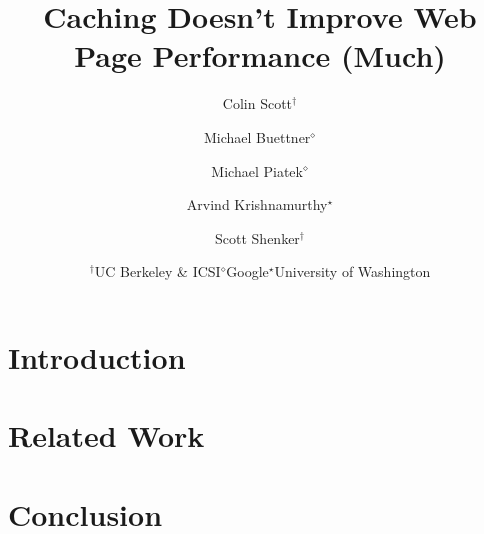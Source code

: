 \documentclass[letterpaper,10pt,twocolumn]{article}
\title{Caching Doesn't Improve Web Page Performance (Much)}
\author{
\rm Colin Scott$^\dagger$ \hspace{-7mm}
\and \rm Michael Buettner$^\diamond$ \hspace{-7mm}
\and \rm Michael Piatek$^\diamond$ \hspace{-7mm}
\and \rm Arvind Krishnamurthy$^\star$ \hspace{-7mm}
\and \rm Scott Shenker$^\dagger$ \\
\and {\begin{tabular}{ccc}$^\dagger$UC Berkeley \& ICSI & $^\diamond$Google &
$^\star$University of Washington\end{tabular}}}
\begin{document}
   \date{}
   \maketitle
   \thispagestyle{empty}

\section{Introduction}
\label{sec:intro}


\section{Related Work}
\label{sec:related_work}


\section{Conclusion}
\label{sec:conclusion}



%

\end{document}
